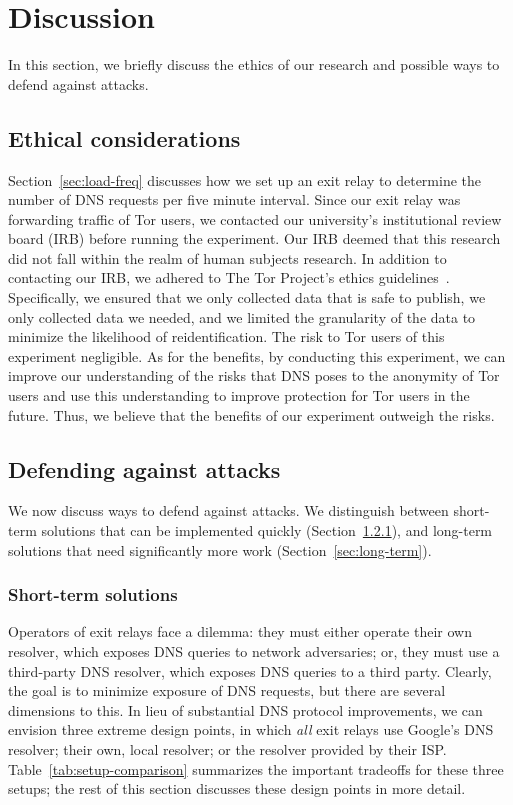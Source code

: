 \section{Discussion}
\label{sec:discussion}

In this section, we briefly discuss the ethics of our research and
possible ways to defend against \name attacks.

\subsection{Ethical considerations}
\label{sec:ethics}

Section~\ref{sec:load-freq} discusses how we set up an exit relay to
determine the number of DNS requests per five minute interval.  Since
our exit relay was forwarding traffic of Tor users, we contacted our
university's institutional review board (IRB) before running the
experiment.  Our IRB deemed that this research did not fall within the
realm of human subjects research.  In addition to contacting our IRB, we
adhered to The Tor Project's ethics guidelines~\cite{ethics-guidelines}.
Specifically, \first we ensured that we only collected data that is safe
to publish, \second we only collected data we needed, and \third we
limited the granularity of the data to minimize the likelihood of
reidentification.  The risk to Tor users of this experiment negligible.
As for the benefits, by conducting this experiment, we can improve our
understanding of the risks that DNS poses to the anonymity of Tor users
and use this understanding to improve protection for Tor users in the
future.
Thus, we believe that the benefits of our experiment outweigh the risks.

\subsection{Defending against \name attacks}

We now discuss ways to defend against \name attacks.  We distinguish
between short-term solutions that can be implemented quickly
(Section~\ref{sec:short-term}), and long-term solutions that need significantly
more work (Section~\ref{sec:long-term}).

\subsubsection{Short-term solutions}
\label{sec:short-term}

Operators of exit relays face a dilemma: they must either operate their own
resolver, which exposes DNS queries to network adversaries; or, they
must use a third-party DNS resolver, which exposes DNS queries to a
third party.  Clearly, the goal is to minimize exposure of DNS requests,
but there are several dimensions to this.  In lieu of substantial DNS
protocol improvements, we can envision three extreme design points,
in which \emph{all} exit relays use \first Google's DNS resolver;
\second their own, local resolver; or \third the resolver provided by
their ISP.  Table~\ref{tab:setup-comparison}
summarizes the important tradeoffs for these three setups; the rest of
this section discusses these design points in more detail.

